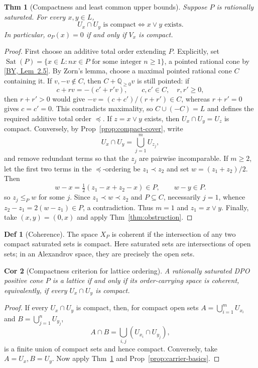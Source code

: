 \documentclass[10pt,letterpaper]{amsart}
\numberwithin{equation}{section}
\newtheorem{thm}{Thm}[section]
\newtheorem{cor}[thm]{Cor}
\theoremstyle{definition}
\newtheorem{defn}{Def}[section]
\newcommand{\Q}{\mathbb Q}
\newcommand{\byref}[2]{\href{https://arxiv.org/pdf/2610.38300v1\#page=#1}{[BY, #2]}}
\begin{document}
\begin{thm}[Compactness and least common upper bounds]\label{thm:compact-min}
Suppose $P$ is rationally saturated. For every $x,y\in L$,
\[
U_x\cap U_y\text{ is compact}\iff x\vee y\text{ exists}.
\]
In particular, $o_P(x)=0$ if and only if $V_x$ is compact.
\end{thm}
\begin{proof}
First choose an additive total order extending $P$. Explicitly, set $\operatorname{Sat}(P)=\{x\in L:nx\in P\text{ for some integer }n\ge1\}$, a pointed rational cone by \byref{5}{Lem~2.5}. By Zorn's lemma, choose a maximal pointed rational cone $C$ containing it. If $v,-v\notin C$, then $C+\Q_{\ge0}v$ is still pointed: if
\[
c+rv=-(c'+r'v),\qquad c,c'\in C,\quad r,r'\ge0,
\]
then $r+r'>0$ would give $-v=(c+c')/(r+r')\in C$, whereas $r+r'=0$ gives $c=c'=0$. This contradicts maximality, so $C\cup(-C)=L$ and defines the required additive total order $\preceq$.
If $z=x\vee y$ exists, then $U_x\cap U_y=U_z$ is compact. Conversely, by Prop~\ref{prop:compact-cover}, write
\[
U_x\cap U_y=\bigcup_{j=1}^m U_{z_j},
\]
and remove redundant terms so that the $z_j$ are pairwise incomparable. If $m\ge2$, let the first two terms in the $\preceq$-ordering be $z_1\prec z_2$ and set $w=(z_1+z_2)/2$. Then
\[
w-x=\tfrac12(z_1-x+z_2-x)\in P,\qquad w-y\in P.
\]
so $z_j\le_Pw$ for some $j$. Since $z_1\prec w\prec z_2$ and $P\subseteq C$, necessarily $j=1$, whence $z_2-z_1=2(w-z_1)\in P$, a contradiction. Thus $m=1$ and $z_1=x\vee y$. Finally, take $(x,y)=(0,x)$ and apply Thm~\ref{thm:obstruction}.
\end{proof}

\begin{defn}[Coherence]\label{def:coherence}
The space $X_P$ is coherent if the intersection of any two compact saturated sets is compact. Here saturated sets are intersections of open sets; in an Alexandrov space, they are precisely the open sets.
\end{defn}

\begin{cor}[Compactness criterion for lattice ordering]\label{cor:coherence}
A rationally saturated DPO positive cone $P$ is a lattice if and only if its order-carrying space is coherent, equivalently, if every $U_x\cap U_y$ is compact.
\end{cor}
\begin{proof}
If every $U_x\cap U_y$ is compact, then, for compact open sets $A=\bigcup_{i=1}^mU_{x_i}$ and $B=\bigcup_{j=1}^nU_{y_j}$,
\[
A\cap B=\bigcup_{i,j}(U_{x_i}\cap U_{y_j}),
\]
is a finite union of compact sets and hence compact. Conversely, take $A=U_x,B=U_y$. Now apply Thm~\ref{thm:compact-min} and Prop~\ref{prop:carrier-basics}.
\end{proof}
\end{document}

